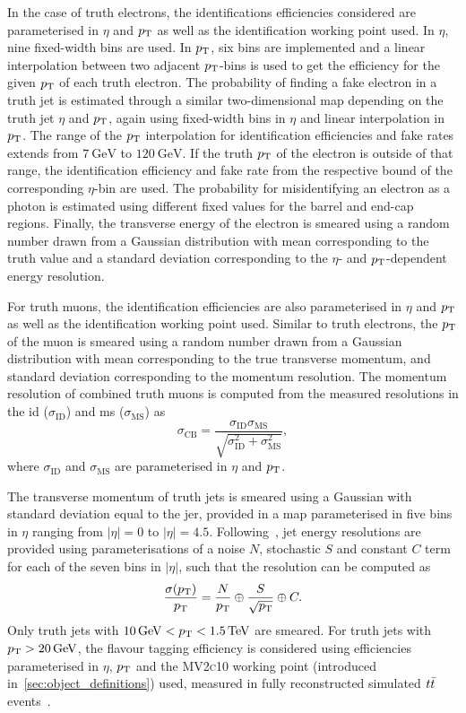 In the case of truth electrons, the identifications efficiencies considered are parameterised in $\eta$ and $p_{\textrm{T}}$ as well as the identification working point used. In $\eta$, nine fixed-width bins are used. In $p_{\textrm{T}}$, six bins are implemented and a linear interpolation between two adjacent $p_{\textrm{T}}$-bins is used to get the efficiency for the given $p_{\textrm{T}}$ of each truth electron. The probability of finding a fake electron in a truth jet is estimated through a similar two-dimensional map depending on the truth jet $\eta$ and $p_{\textrm{T}}$, again using fixed-width bins in $\eta$ and linear interpolation in $p_{\textrm{T}}$. The range of the $p_{\textrm{T}}$ interpolation for identification efficiencies and fake rates extends from $\SI{7}{\GeV}$ to $\SI{120}{\GeV}$. If the truth $p_{\textrm{T}}$ of the electron is outside of that range, the identification efficiency and fake rate from the respective bound of the corresponding $\eta$-bin are used. The probability for misidentifying an electron as a photon is estimated using different fixed values for the barrel and end-cap regions. Finally, the transverse energy of the electron is smeared using a random number drawn from a Gaussian distribution with mean corresponding to the truth value and a standard deviation corresponding to the $\eta$- and $p_{\textrm{T}}$-dependent energy resolution.  

For truth muons, the identification efficiencies are also parameterised in $\eta$ and $p_{\textrm{T}}$ as well as the identification working point used. Similar to truth electrons, the  $p_{\textrm{T}}$ of the muon is smeared using a random number drawn from a Gaussian distribution with mean corresponding to the true transverse momentum, and standard deviation corresponding to the momentum resolution. The momentum resolution of combined truth muons is computed from the measured resolutions in the \gls{id} ($\sigma_\mathrm{ID}$) and \gls{ms} ($\sigma_\mathrm{MS}$) as
\begin{equation}
	\sigma_\mathrm{CB} = \frac{\sigma_\mathrm{ID}\sigma_\mathrm{MS}}{\sqrt{\sigma_\mathrm{ID}^2 + \sigma_\mathrm{MS}^2}},
\end{equation}
where $\sigma_\mathrm{ID}$ and $\sigma_\mathrm{MS}$ are parameterised in $\eta$ and $p_{\textrm{T}}$.

The transverse momentum of truth jets is smeared using a Gaussian with standard deviation equal to the \gls{jer}, provided in a map parameterised in five bins in $\eta$ ranging from $\vert\eta\vert = 0$ to $\vert\eta\vert = 4.5$. Following~\cite{Aad:2020flx}, jet energy resolutions are provided using parameterisations of a noise $N$, stochastic $S$ and constant $C$ term for each of the seven bins in $\vert\eta\vert$, such that the resolution can be computed as
\begin{equation}
	\frac{\sigma(p_{\textrm{T}})}{p_{\textrm{T}}} = \frac{N}{p_{\textrm{T}}}\oplus\frac{S}{\sqrt{p_{\textrm{T}}}}\oplus C.
\end{equation}
Only truth jets with $\SI{10}{\GeV} < \pt < \SI{1.5}{\TeV}$ are smeared. For truth jets with $\pt > \SI{20}{\GeV}$, the flavour tagging efficiency is considered using efficiencies parameterised in $\eta$, $p_{\textrm{T}}$ and the \textsc{MV2c10} working point (introduced in~\cref{sec:object_definitions}) used, measured in fully reconstructed simulated $t\bar{t}$ events~\cite{FTAG-2018-01}.

